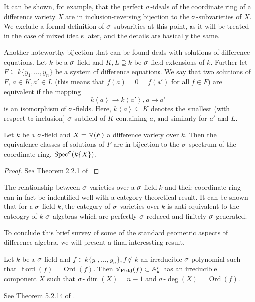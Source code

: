 It can be shown, for example, that the perfect $\sigma$-ideals of the coordinate ring of a difference variety $X$
are in inclusion-reversing bijection to the $\sigma$-subvarieties of $X$. We exclude a formal definition of $\sigma$-subvarities at this point, as it will be treated in the case of mixed ideals later, and the details are basically the same.


Another noteworthy bijection that can be found deals with solutions of difference equations.
Let $k$ be a $\sigma$-field and $K,L \supseteq k$ be $\sigma$-field extensions of $k$. Further let $F \subseteq k\{y_1,\ldots,y_n\}$ be a system of difference equations. We say that two solutions of $F$, $a \in K, a' \in L$ (this means that $f(a) = 0 = f(a')$ for all $f \in F$) are equivalent if the mapping $$k\left<a\right> \rightarrow k\left<a'\right>, a \mapsto a'$$ is an isomorphism of $\sigma$-fields. Here, $k\left< a \right> \subseteq K$ denotes the smallest (with respect to inclusion) $\sigma$-subfield of $K$ containing $a$, and similarly for $a'$ and $L$.

\begin{prop}
Let $k$ be a $\sigma$-field and $X = \mathbb{V}(F)$ a difference variety over $k$. Then the equivalence classes of solutions of $F$
are in bijection to the $\sigma$-spectrum of the coordinate ring, $\operatorname{Spec}^\sigma(k\{X\})$.
\begin{proof} See Theorem 2.2.1 of \cite{wibmer}
\end{proof}
\end{prop}

The relationship between $\sigma$-varieties over a $\sigma$-field $k$ and their coordinate ring can in fact be indentified well with a category-theoretical result.
It can be shown that for a $\sigma$-field $k$, the category of $\sigma$-varieties over $k$ is anti-equivalent to the cateogry of $k$-$\sigma$-algebras which are perfectly $\sigma$-reduced and finitely $\sigma$-generated.

To conclude this brief survey of some of the standard geometric aspects of difference algebra, we will present a final interessting result.

\begin{theorem}\label{irredcomp}
Let $k$ be a $\sigma$-field and $f \in k\{y_1,\ldots,y_n\}, f \notin k$ an irreducible $\sigma$-polynomial such that $\operatorname{Eord}(f) = \operatorname{Ord}(f)$. Then $\mathbb{V}_{\operatorname{Field}}(f) \subset \mathbb{A}_k^n$ has an irreducible component $X$ such that $\sigma$-$\dim(X) = n-1$ and $\sigma$-$\operatorname{deg}(X) = \operatorname{Ord}(f)$.
\begin{bew}
See Theorem 5.2.14 of \cite{wibmer}.
\end{bew}
\end{theorem}
